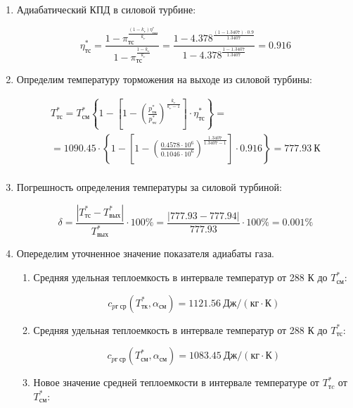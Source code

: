 \documentclass[a4paper,12pt]{article}
\begin{document}
\begin{enumerate}
	\item Адиабатический КПД в силовой турбине:
	
	\[
	\eta_{тс}^* = \frac{
					1 - \pi_{тс} ^ 
							{\frac{ (1 - k_г ) \eta_{тсп}^* }{ k_г }}
				}{
					1 - \pi_{тс} ^ 
							{\frac{ 1 - k_г }{ k_г }} 
				} = 
			\frac{
				1 - 4.378 ^ 
						{\frac{ (1 - 1.3407 ) \cdot 0.9 }{ 1.3407 }}
			}{
				1 - 4.378 ^ 
						{\frac{ 1 - 1.3407 }{ 1.3407 }} 
			} = 
		0.916
	\]	
	
	\item Определим температуру торможения на выходе из силовой турбины:
	
	\begin{gather*}
	    T_{тс}^* = T_{см}^*
		\left\lbrace
			1 -
			\left[
				1 -
					\left(
						\frac{ p_{тк}^* }{ p_{тс}^* }
					\right) ^ \frac{ k_г }{ k_г - 1 }
			\right] \cdot \eta_{тс}^*
		\right\rbrace =\\
	    = 1090.45 \cdot
		\left\lbrace
			1 -
			\left[
				1 -
					\left(
						\frac{ 0.4578 \cdot 10^6 }{ 0.1046 \cdot 10^6 }
					\right) ^ \frac{ 1.3407 }{ 1.3407 - 1 }
			\right] \cdot 0.916
		\right\rbrace =
	777.93\ К\\
	\end{gather*}
	
	\item Погрешность определения температуры за силовой турбиной:
	
	\[
	\delta = \frac{ 
					\left| T_{тс}^* - T_{вых}^* \right|
				}{ 
					T_{вых}^*
				} \cdot 100 \%= 
		\frac{ 
			\left| 777.93 - 777.94 \right|
		}{ 
			777.93
		} \cdot 100 \% =
	0.001 \%
	\]
	
	\item Опеределим уточненное значение показателя адиабаты газа.
	
	\begin{enumerate}
	
		\item Средняя удельная теплоемкость в интервале температур от 288 К до $ T_{см}^* $:
		
		\[
		c_{pг\ ср} (T_{тк}^*, \alpha_{см}) = 1121.56\ Дж / (кг \cdot К)
		\]
		
		\item Средняя удельная теплоемкость в интервале температур от 288 К до $ T_{тс}^* $:
		
		\[
		c_{pг\ ср} (T_{см}^*, \alpha_{см}) = 1083.45\ Дж / (кг \cdot К)
		\]
		
		\item Новое значение средней теплоемкости в интервале температуре от $ T_{тc}^* $ от $ T_{см}^* $:
		

\end{enumerate}
\end{enumerate}
\end{document}
